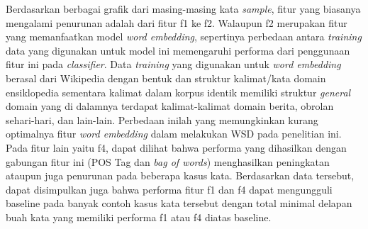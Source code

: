 Berdasarkan berbagai grafik dari masing-masing kata \textit{sample}, fitur yang biasanya mengalami penurunan adalah dari fitur f1 ke f2. Walaupun f2 merupakan fitur yang memanfaatkan model \textit{word embedding}, sepertinya perbedaan antara \textit{training} data yang digunakan untuk model ini memengaruhi performa dari penggunaan fitur ini pada \textit{classifier}. Data \textit{training} yang digunakan untuk \textit{word embedding} berasal dari Wikipedia dengan bentuk dan struktur kalimat/kata domain ensiklopedia sementara kalimat dalam korpus identik memiliki struktur \textit{general} domain yang di dalamnya terdapat kalimat-kalimat domain berita, obrolan sehari-hari, dan lain-lain. Perbedaan inilah yang memungkinkan kurang optimalnya fitur \textit{word embedding} dalam melakukan WSD pada penelitian ini. Pada fitur lain yaitu f4, dapat dilihat bahwa performa yang dihasilkan dengan gabungan fitur ini (POS Tag dan \textit{bag of words}) menghasilkan peningkatan ataupun juga penurunan pada beberapa kasus kata. Berdasarkan data tersebut, dapat disimpulkan juga bahwa performa fitur f1 dan f4 dapat mengungguli baseline pada banyak contoh kasus kata tersebut dengan total minimal delapan buah kata yang memiliki performa f1 atau f4 diatas baseline.